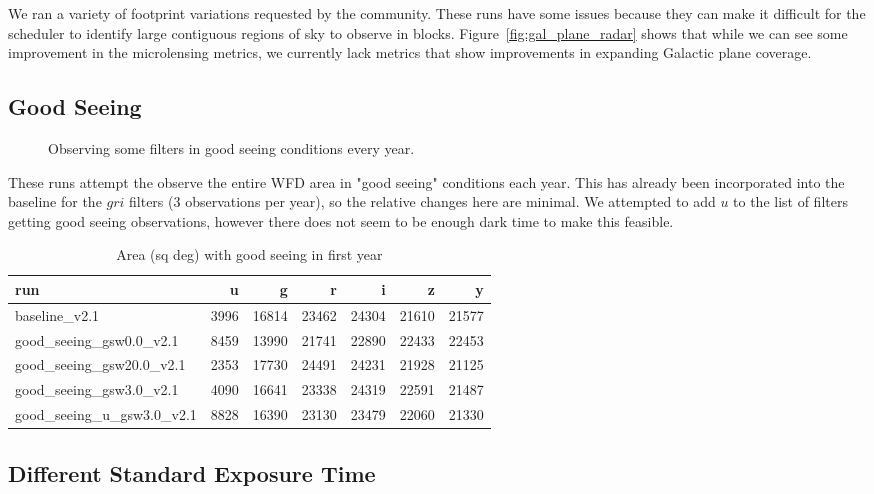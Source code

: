 We ran a variety of footprint variations requested by the community. These runs have some issues because they can make it difficult for the scheduler to identify large contiguous regions of sky to observe in blocks. Figure~\ref{fig:gal_plane_radar} shows that while we can see some improvement in the microlensing metrics, we currently lack metrics that show improvements in expanding Galactic plane coverage.



\subsection{Good Seeing}


\begin{figure}
\caption{Observing some filters in good seeing conditions every year. }
\end{figure}


These runs attempt the observe the entire WFD area in "good seeing" conditions each year. This has already been incorporated into the baseline for the $gri$ filters (3 observations per year), so the relative changes here are minimal. We attempted to add $u$ to the list of filters getting good seeing observations, however there does not seem to be enough dark time to make this feasible.


\begin{table}
\caption{Area (sq deg) with good seeing in first year}
\begin{tabular}{lrrrrrr}
                      run &    u &     g &     r &     i &     z &     y \\
                      \hline
            baseline\_v2.1 & 3996 & 16814 & 23462 & 24304 & 21610 & 21577 \\
  good\_seeing\_gsw0.0\_v2.1 & 8459 & 13990 & 21741 & 22890 & 22433 & 22453 \\
 good\_seeing\_gsw20.0\_v2.1 & 2353 & 17730 & 24491 & 24231 & 21928 & 21125 \\
  good\_seeing\_gsw3.0\_v2.1 & 4090 & 16641 & 23338 & 24319 & 22591 & 21487 \\
good\_seeing\_u\_gsw3.0\_v2.1 & 8828 & 16390 & 23130 & 23479 & 22060 & 21330 \\
\end{tabular}
\end{table}

\subsection{Different Standard Exposure Time}


